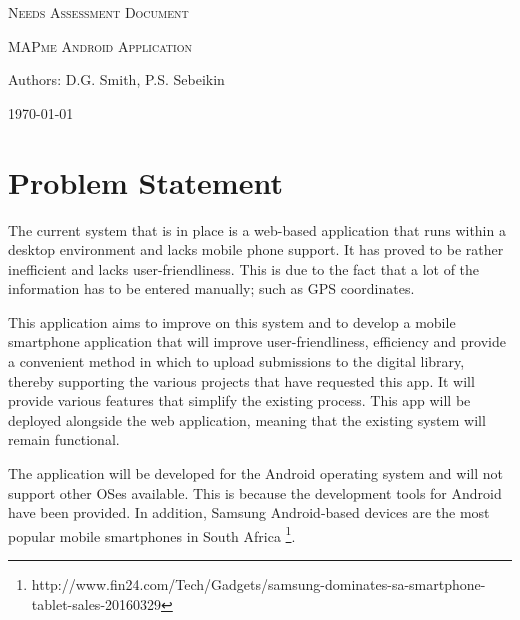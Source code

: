 \documentclass[12pt,a4paper,oneside]{report}
\begin{document}
\begin{titlepage}
	\centering
	{\scshape\LARGE Needs Assessment Document \par}
	\vspace{1cm}
	{\scshape\Large MAPme Android Application\par}
	\vspace{1.5cm}
	{\LARGE Authors: D.G. Smith, P.S. Sebeikin\par}
	\vspace{2cm}
	{\large \today\par}
\end{titlepage}
\tableofcontents
\pagebreak
\section{Problem Statement}
  \begin{spacing}{1.4}
    The current system that is in place is a web-based application that runs within a desktop environment and lacks mobile phone support. It has proved to be rather inefficient and lacks user-friendliness. This is due to the fact that a lot of the information has to be entered manually; such as GPS coordinates.

    This application aims to improve on this system and to develop a mobile smartphone application that will improve user-friendliness, efficiency and provide a convenient method in which to upload submissions to the digital library, thereby supporting the various projects that have requested this app. It will provide various features that simplify the existing process. This app will be deployed alongside the web application, meaning that the existing system will remain functional.

    The application will be developed for the Android operating system and will not support other OSes available. This is because the development tools for Android have been provided. In addition, Samsung Android-based devices are the most popular mobile smartphones in South Africa \footnote{http://www.fin24.com/Tech/Gadgets/samsung-dominates-sa-smartphone-tablet-sales-20160329}.
  \end{spacing}

\end{document}
